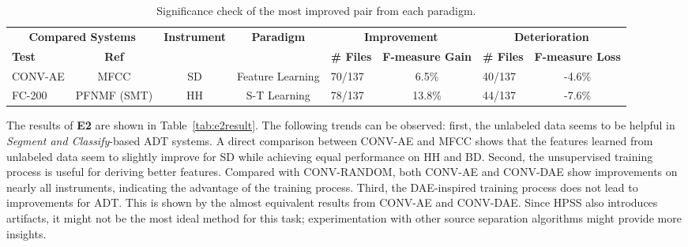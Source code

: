 \documentclass{article}
\newcommand{\comment}[1]{{\textcolor{blue}{#1}}}
\begin{document}
\begin{table}[t]
\centering
\footnotesize
\begin{tabularx}{\textwidth}{XcccXcXc}%
\hline
\multicolumn{2}{c}{\textbf{Compared Systems}} & \multirow{2}{*}{\textbf{Instrument}} & \multirow{2}{*}{\textbf{Paradigm}} & \multicolumn{2}{c}{\textbf{Improvement}}    & \multicolumn{2}{c}{\textbf{Deterioration}}  \\ \cline{1-2} \cline{5-8} 
\textbf{Test}          & \textbf{Ref}         &                                      &                                    & \textbf{\# Files} & \textbf{F-measure Gain} & \textbf{\# Files} & \textbf{F-measure Loss} \\ \hline
CONV-AE               & MFCC                 & SD                                   & Feature Learning                   & 70/137            & 6.5\%                   & 40/137            & -4.6\%                  \\
FC-200                & PFNMF (SMT)          & HH                                   & S-T Learning                       & 78/137            & 13.8\%                  & 44/137            & -7.6\%                  \\ \hline
\end{tabularx}%
\caption{Significance check of the most improved pair from each paradigm.}
\label{tab:improvCheck}
\end{table}

The results of \textbf{E2} are shown in Table~\ref{tab:e2result}. The following trends can be observed: first, the unlabeled data seems to be helpful in \textit{Segment and Classify}-based ADT systems. A direct comparison between CONV-AE and MFCC shows that the features learned from unlabeled data seem to slightly improve for SD while achieving equal performance on HH and BD. Second, the unsupervised training process is useful for deriving better features. Compared with CONV-RANDOM, both CONV-AE and CONV-DAE show improvements on nearly all instruments, indicating the advantage of the training process. Third, the DAE-inspired training process does not lead to improvements for ADT. This is shown by the almost equivalent results from CONV-AE and CONV-DAE. Since HPSS also introduces artifacts, it might not be the most ideal method for this task;  experimentation with other source separation algorithms might provide more insights. 
\end{document}
